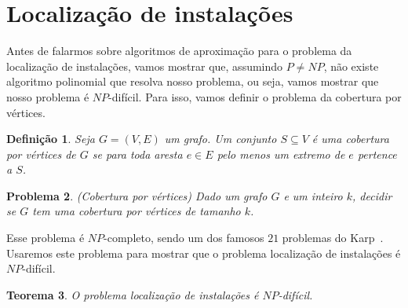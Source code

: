 \documentclass[12pt]{article}
\newtheorem{theorem}{Teorema}[section]
\newtheorem{definition}[theorem]{Definição}
\newtheorem{problem}[theorem]{Problema}
\newcommand{\NP}{\mathit{NP}}
\begin{document}
\section{Localização de instalações}
Antes de falarmos sobre algoritmos de aproximação para o problema da localização de instalações, vamos mostrar que, assumindo $P\not=\NP$, não existe algoritmo polinomial que resolva nosso problema, ou seja, vamos mostrar que nosso problema é $\NP$-difícil. Para isso, vamos definir o problema da cobertura por vértices.

\begin{definition}
    Seja $G = (V,E)$ um grafo. Um conjunto $S \subseteq V$ é uma \emph{cobertura por vértices} de $G$ se para toda aresta $e \in E$ pelo menos um extremo de $e$ pertence a $S$.
\end{definition}


\begin{problem}(Cobertura por vértices)
    Dado um grafo $G$ e um inteiro $k$, decidir se $G$ tem uma cobertura por vértices de tamanho $k$.
\end{problem}
Esse problema é $\NP$-completo, sendo um dos famosos $21$ problemas do Karp~\cite{Karp1972}. Usaremos este problema para mostrar que o problema localização de instalações é $\NP$-difícil.

\begin{theorem}
    O problema localização de instalações é $\NP$-difícil.
\end{theorem}
\end{document}
